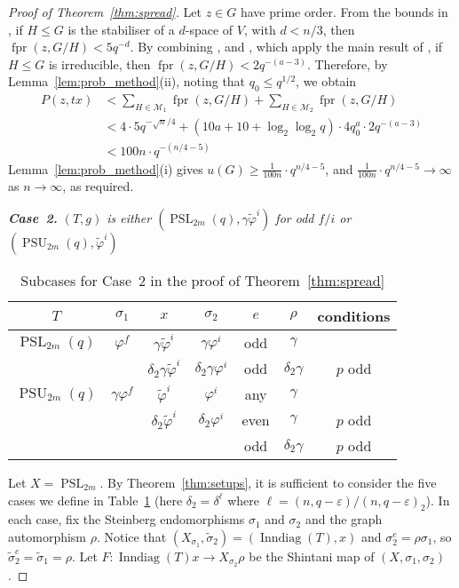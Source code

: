 \documentclass[11pt]{article}
\numberwithin{equation}{section}
\theoremstyle{shdefinition}
\theoremstyle{shplain}
\newcommand{\g}{\gamma}
\renewcommand{\d}{\delta}
\newcommand{\e}{\varepsilon}
\newcommand{\p}{\varphi}
\renewcommand{\wp}{\widetilde{\varphi}}
\newcommand{\s}{\sigma}
\newcommand{\ws}{\widetilde{\sigma}}
\newcommand{\M}{\mathcal{M}}
\newcommand{\<}{\langle}
\renewcommand{\>}{\rangle}
\renewcommand{\leq}{\leqslant}
\renewcommand{\geq}{\geqslant}
\newcommand{\Inndiag}{\operatorname{Inndiag}}
\newcommand{\fpr}{\operatorname{fpr}}
\renewcommand{\:}{\colon}
\newcommand{\PSL}{\operatorname{PSL}}
\newcommand{\PSU}{\operatorname{PSU}}
\begin{document}
\begin{proof}[Proof of Theorem~\ref{thm:spread}]
Let $z \in G$ have prime order. From the bounds in \cite[Section~3]{ref:GuralnickKantor00}, if $H \leq G$ is the stabiliser of a $d$-space of $V$, with $d < n/3$, then $\fpr(z,G/H) < 5q^{-d}$. By combining \cite[Corollary~2.9]{ref:BurnessGuest13}, \cite[Proposition~3.2]{ref:Harper17} and \cite[Propositions~4.2.2 and~4.2.3]{ref:Harper}, which apply the main result of \cite{ref:Burness071}, if $H \leq G$ is irreducible, then $\fpr(z,G/H) < 2q^{-(a-3)}$. Therefore, by Lemma~\ref{lem:prob_method}(ii), noting that $q_0 \leq q^{1/2}$, we obtain
\begin{align*}
P(z,tx) &< \sum_{H \in \M_1} \fpr(z,G/H) + \sum_{H \in \M_2} \fpr(z,G/H) \\
        &< 4 \cdot 5 q^{-\sqrt{n}/4} + (10a+10+\log_2\log_2{q}) \cdot 4q_0^a \cdot 2q^{-(a-3)}   \\
        &< 100n \cdot q^{-(n/4-5)}
\end{align*}
Lemma~\ref{lem:prob_method}(i) gives $u(G) \geq \frac{1}{100n} \cdot q^{n/4-5}$, and $\frac{1}{100n} \cdot q^{n/4-5} \to \infty$ as $n \to \infty$, as required. \vspace{0.5\baselineskip}

\emph{\textbf{Case~2.} $(T,g)$ is either $(\PSL_{2m}(q),\g\wp^i)$ for odd $f/i$ or $(\PSU_{2m}(q),\wp^i)$}\nopagebreak

\begin{table}
\centering
\caption{Subcases for Case~2 in the proof of Theorem~\ref{thm:spread}} \label{tab:spread_case_2}
\begin{tabular}{ccccccc}
\hline
$T$            & $\s_1$   & $x$           & $\s_2$       & $e$  & $\rho$   & conditions  \\
\hline
$\PSL_{2m}(q)$ & $\p^f$   & $\g\wp^i$     & $\g\p^i$     & odd  & $\g$     &             \\
               &          & $\d_2\g\wp^i$ & $\d_2\g\p^i$ & odd  & $\d_2\g$ & $p$ odd     \\
$\PSU_{2m}(q)$ & $\g\p^f$ & $\wp^i$       & $\p^i$       & any  & $\g$     &             \\
               &          & $\d_2\wp^i$   & $\d_2\p^i$   & even & $\g$     & $p$ odd     \\
               &          &               &              & odd  & $\d_2\g$ & $p$ odd     \\
\hline
\end{tabular}
\end{table}

Let $X = \PSL_{2m}$. By Theorem~\ref{thm:setups}, it is sufficient to consider the five cases we define in Table~\ref{tab:spread_case_2} (here $\d_2 = \d^{\ell}$ where $\ell = (n,q-\e)/(n,q-\e)_2$). In each case, fix the Steinberg endomorphisms $\s_1$ and $\s_2$ and the graph automorphism $\rho$. Notice that $(X_{\s_1},\ws_2) = (\Inndiag(T), x)$ and $\s_2^e = \rho\s_1$, so $\ws_2^e = \ws_1 = \rho$. Let $F\:\Inndiag(T)x \to X_{\s_2}\rho$ be the Shintani map of $(X,\s_1,\s_2)$. 


\end{proof}
\end{document}
